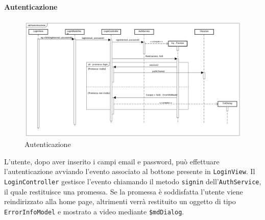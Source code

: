 \paragraph{Autenticazione}

\label{Autenticazione}

\begin{figure}[ht]
	\centering
	\includegraphics[scale=0.35,keepaspectratio]{UML/DiagrammiDiSequenza/Front-end/Login.png}
	\caption{Autenticazione}
\end{figure} \FloatBarrier

L'utente, dopo aver inserito i campi email e password, può effettuare l'autenticazione avviando l'evento associato al bottone presente in \texttt{LoginView}. Il \texttt{LoginController} gestisce l'evento chiamando il metodo \texttt{signin} dell'\texttt{AuthService}, il quale restituisce una promessa. Se la promessa è soddisfatta l'utente viene reindirizzato alla home page, altrimenti verrà restituito un oggetto di tipo \texttt{ErrorInfoModel} e mostrato a video mediante \texttt{\$mdDialog}.
